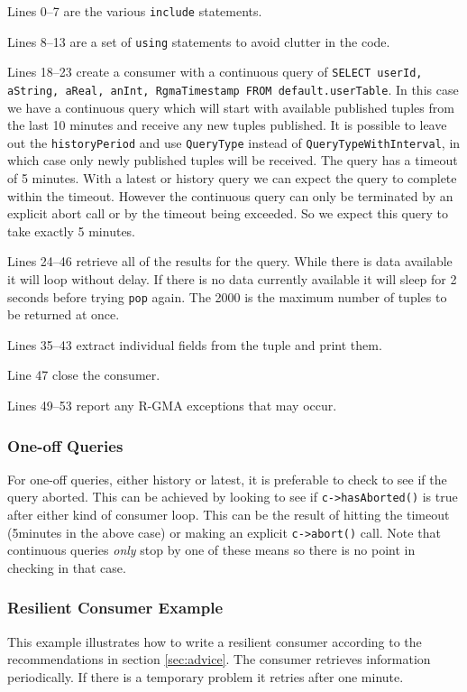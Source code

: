 Lines 0--7 are the various \texttt{include} statements.

Lines 8--13 are a set of \texttt{using} statements to avoid clutter
in the code.

Lines 18--23 create a consumer with a continuous query
of \texttt{SELECT userId, aString, aReal, anInt, RgmaTimestamp FROM
default.userTable}. In this case we have a continuous query which will
start with available published tuples from the last 10 minutes and
receive any new tuples published. It is possible to leave out the
\texttt{historyPeriod} and use \texttt{QueryType}
instead of \texttt{QueryTypeWithInterval}, in which case only newly
published tuples will be received. The query has a timeout of 5
minutes. With a latest or history query we can expect the query to
complete within the timeout. However the continuous query can only be
terminated by an explicit abort call or by the timeout being
exceeded. So we expect this query to take exactly 5 minutes.

Lines 24--46 retrieve all of the results for the query. While there is
data available it will loop without delay. If there is no data
currently available it will sleep for 2 seconds before trying
\texttt{pop} again. The 2000 is the maximum number of tuples to be
returned at once.

Lines 35–43 extract individual fields from the tuple and print them.

Line 47 close the consumer.

Lines 49--53 report any R-GMA exceptions that may occur.

\subsubsection{One-off Queries}
For one-off queries, either history or latest, it is preferable to
check to see if the query aborted. This can be achieved by looking to
see if \texttt{c->hasAborted()} is true after either kind of consumer
loop. This can be the result of hitting the timeout (5minutes in the
above case) or making an explicit \texttt{c->abort()} call. Note that
continuous queries \emph{only} stop by one of these means so there is
no point in checking in that case.

\subsubsection{Resilient Consumer Example}
This example illustrates how to write a resilient consumer according
to the recommendations in section \ref{sec:advice}.  The consumer
retrieves information periodically. If there is a temporary problem it
retries after one minute.

